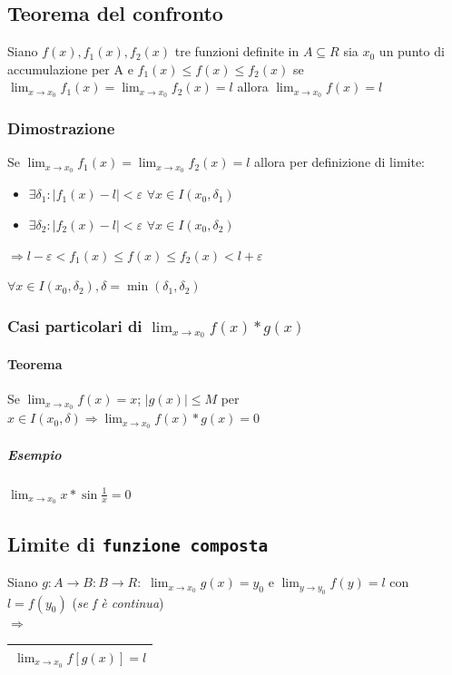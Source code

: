\subsection{Teorema del confronto}
Siano $f(x),f_1(x),f_2(x)$ tre funzioni definite in $A\subseteq R$ sia $x_0$ un
punto di accumulazione per A e $f_1(x)\leq f(x) \leq f_2(x)$ se $\lim_{x\to
x_0}f_1(x)=\lim_{x\to x_0} f_2(x)=l$ allora $\lim_{x\to x_0} f(x)=l$
\subsubsection{Dimostrazione}
Se $\lim_{x\to x_0} f_1(x)=\lim_{x\to x_0} f_2(x)=l$ allora per definizione di
limite:
\begin{itemize}
	\item $\exists \delta_1:|f_1(x)-l|<\varepsilon$ $\forall x \in I(x_0,\delta_1)$
	\item $\exists \delta_2:|f_2(x)-l|<\varepsilon$ $\forall x \in
		I(x_0,\delta_2)$
\end{itemize}
\begin{center}
	$\Rightarrow l-\varepsilon < f_1(x) \leq f(x)\leq f_2(x) < l+ \varepsilon$
\end{center}
$\forall x \in I(x_0,\delta_2), \delta = \min (\delta_1,\delta_2)$
\subsubsection{Casi particolari di $\lim_{x\to x_0} f(x)*g(x)$}
\paragraph{Teorema}
Se $\lim_{x\to x_0} f(x)=x$; $|g(x)|\leq M$ per $x\in I(x_0,\delta)\Rightarrow
\lim_{x\to x_0}f(x)*g(x)=0$
\subparagraph{Esempio} $\lim_{x\to x_0}x*\sin\frac{1}{x}=0$
\subsection{Limite di \texttt{funzione composta}}
Siano $g:A\to B:B\to R:$ $\lim_{x\to x_0}g(x)=y_0$ e $\lim_{y\to y_0}f(y)=l$
con $l=f(y_0)$ (\textit{se f è continua})\\
$\Rightarrow$\begin{tabular}{|l|}
	\hline$\lim_{x\to x_0}f[g(x)]=l$\\\hline
\end{tabular}

